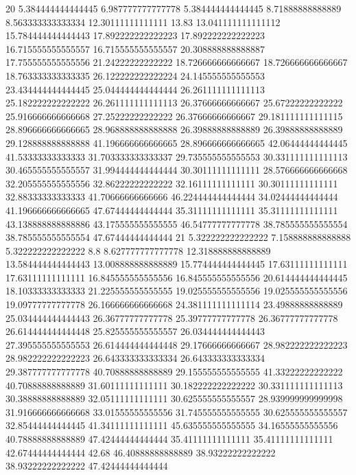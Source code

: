 20 5.384444444444445 6.987777777777778 5.384444444444445 8.71888888888889 8.563333333333334 12.30111111111111 13.83 13.041111111111112 15.784444444444443 17.892222222222223 17.892222222222223 16.715555555555557 16.715555555555557 20.308888888888887 17.755555555555556 21.24222222222222 18.726666666666667 18.726666666666667 18.763333333333335 26.122222222222224 24.145555555555553 23.434444444444445 25.044444444444444 26.261111111111113 25.182222222222222 26.261111111111113 26.37666666666667 25.67222222222222 25.916666666666668 27.25222222222222 26.37666666666667 29.181111111111115 28.896666666666665 28.968888888888888 26.39888888888889 26.39888888888889 29.128888888888888 41.196666666666665 28.896666666666665 42.06444444444445 41.53333333333333 31.703333333333337 29.735555555555553 30.331111111111113 30.465555555555557 31.994444444444444 30.30111111111111 28.576666666666668 32.205555555555556 32.86222222222222 32.16111111111111 30.30111111111111 32.88333333333333 41.70666666666666 46.224444444444444 34.02444444444444 41.196666666666665 47.67444444444444 35.31111111111111 35.31111111111111 43.138888888888886 43.175555555555555 46.54777777777778 38.785555555555554 38.785555555555554 47.67444444444444
21 5.322222222222222 7.158888888888888 5.322222222222222 8.8 8.627777777777778 12.318888888888889 13.584444444444443 13.008888888888889 15.774444444444445 17.63111111111111 17.63111111111111 16.845555555555556 16.845555555555556 20.614444444444445 18.10333333333333 21.225555555555555 19.025555555555556 19.025555555555556 19.09777777777778 26.166666666666668 24.381111111111114 23.49888888888889 25.034444444444443 26.36777777777778 25.39777777777778 26.36777777777778 26.614444444444448 25.825555555555557 26.034444444444443 27.395555555555553 26.614444444444448 29.17666666666667 28.982222222222223 28.982222222222223 26.643333333333334 26.643333333333334 29.387777777777778 40.70888888888889 29.155555555555555 41.33222222222222 40.70888888888889 31.60111111111111 30.182222222222222 30.331111111111113 30.38888888888889 32.05111111111111 30.625555555555557 28.939999999999998 31.916666666666668 33.01555555555556 31.745555555555555 30.625555555555557 32.85444444444445 41.34111111111111 45.635555555555555 34.16555555555556 40.78888888888889 47.42444444444444 35.41111111111111 35.41111111111111 42.67444444444444 42.68 46.40888888888889 38.93222222222222 38.93222222222222 47.42444444444444
